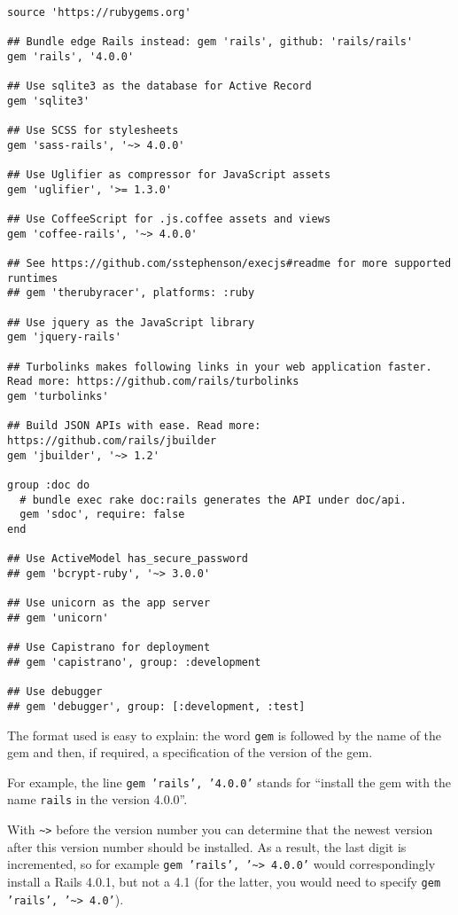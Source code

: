 \documentclass[a4paper]{book}
\newcounter{tab}[chapter]
\begin{document}
\begin{shaded}\begin{verbatim}
source 'https://rubygems.org'

## Bundle edge Rails instead: gem 'rails', github: 'rails/rails'
gem 'rails', '4.0.0'

## Use sqlite3 as the database for Active Record
gem 'sqlite3'

## Use SCSS for stylesheets
gem 'sass-rails', '~> 4.0.0'

## Use Uglifier as compressor for JavaScript assets
gem 'uglifier', '>= 1.3.0'

## Use CoffeeScript for .js.coffee assets and views
gem 'coffee-rails', '~> 4.0.0'

## See https://github.com/sstephenson/execjs#readme for more supported runtimes
## gem 'therubyracer', platforms: :ruby

## Use jquery as the JavaScript library
gem 'jquery-rails'

## Turbolinks makes following links in your web application faster. Read more: https://github.com/rails/turbolinks
gem 'turbolinks'

## Build JSON APIs with ease. Read more: https://github.com/rails/jbuilder
gem 'jbuilder', '~> 1.2'

group :doc do
  # bundle exec rake doc:rails generates the API under doc/api.
  gem 'sdoc', require: false
end

## Use ActiveModel has_secure_password
## gem 'bcrypt-ruby', '~> 3.0.0'

## Use unicorn as the app server
## gem 'unicorn'

## Use Capistrano for deployment
## gem 'capistrano', group: :development

## Use debugger
## gem 'debugger', group: [:development, :test]
\end{verbatim}\end{shaded}

The format used is easy to explain: the word \texttt{gem} is followed by the name of the gem and then, if required, a specification of the version of the gem.

For example, the line \texttt{gem 'rails', '4.0.0'} stands for “install the gem with the name \texttt{rails} in the version 4.0.0”.

With \texttt{\textasciitilde{}\textgreater{}} before the version number you can determine that the newest version after this version number should be installed. As a result, the last digit is incremented, so for example \texttt{gem 'rails',     '\textasciitilde{}\textgreater{} 4.0.0'} would correspondingly install a Rails 4.0.1, but not a 4.1 (for the latter, you would need to specify \texttt{gem 'rails', '\textasciitilde{}\textgreater{}     4.0'}).
\end{document}
